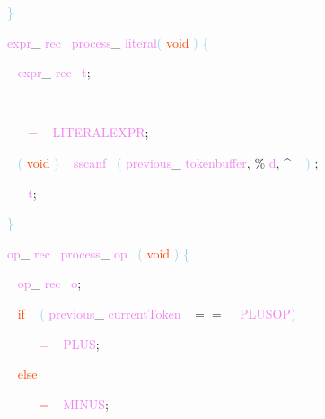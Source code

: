 \documentclass[8, usernames, dvipsnames]{beamer}
\begin{document}
\begin{frame}

 \textcolor{SkyBlue}{\} }

 
 \textcolor{Violet}{expr}\textcolor{Sepia}{\_}
\textcolor{Violet}{rec}\textcolor{White}{\ }
\textcolor{Violet}{process}\textcolor{Sepia}{\_}
\textcolor{Violet}{literal}\textcolor{SkyBlue}{(}
\textcolor{OrangeRed}{void}
\textcolor{SkyBlue}{)}
\textcolor{SkyBlue}{\{ }

 \textcolor{White}{\   }
\textcolor{Violet}{expr}\textcolor{Sepia}{\_}
\textcolor{Violet}{rec}\textcolor{White}{\ }
\textcolor{Violet}{t}\textcolor{Sepia}{;}

 \textcolor{White}{\   }

 \textcolor{White}{\   }
\textcolor{White}{\ }
\textcolor{Salmon}{=}
\textcolor{White}{\ }
\textcolor{Violet}{LITERALEXPR}\textcolor{Sepia}{;}

 \textcolor{White}{\   }
\textcolor{SkyBlue}{(}
\textcolor{OrangeRed}{void}
\textcolor{SkyBlue}{)}
\textcolor{White}{\ }
\textcolor{Violet}{sscanf}\textcolor{White}{\ }
\textcolor{SkyBlue}{(}
\textcolor{Violet}{previous}\textcolor{Sepia}{\_}
\textcolor{Violet}{tokenbuffer}\textcolor{Sepia}{,}
\textcolor{Apricot}{\%}
\textcolor{Violet}{d}\textcolor{Sepia}{,}
\textcolor{MidnightBlue}{\textasciicircum}
\textcolor{White}{\ }
\textcolor{SkyBlue}{)}
\textcolor{Sepia}{;}

 
 \textcolor{White}{\   }
\textcolor{OrangeRed}{	}
\textcolor{White}{\ }
\textcolor{Violet}{t}\textcolor{Sepia}{;}

 \end{frame}
\begin{frame}

 \textcolor{SkyBlue}{\} }

 
 \textcolor{Violet}{op}\textcolor{Sepia}{\_}
\textcolor{Violet}{rec}\textcolor{White}{\ }
\textcolor{Violet}{process}\textcolor{Sepia}{\_}
\textcolor{Violet}{op}\textcolor{White}{\ }
\textcolor{SkyBlue}{(}
\textcolor{OrangeRed}{void}
\textcolor{SkyBlue}{)}
\textcolor{SkyBlue}{\{ }

 
 \textcolor{White}{\   }
\textcolor{Violet}{op}\textcolor{Sepia}{\_}
\textcolor{Violet}{rec}\textcolor{White}{\ }
\textcolor{Violet}{o}\textcolor{Sepia}{;}

 \textcolor{White}{\   }
\textcolor{OrangeRed}{if}
\textcolor{White}{\ }
\textcolor{SkyBlue}{(}
\textcolor{Violet}{previous}\textcolor{Sepia}{\_}
\textcolor{Violet}{currentToken}\textcolor{White}{\ }
\textcolor{OliveGreen}{$==$}
\textcolor{White}{\ }
\textcolor{Violet}{PLUSOP}\textcolor{SkyBlue}{)}

 \textcolor{White}{\   }
\textcolor{White}{\   }
\textcolor{White}{\ }
\textcolor{Salmon}{=}
\textcolor{White}{\ }
\textcolor{Violet}{PLUS}\textcolor{Sepia}{;}

 \textcolor{White}{\   }
\textcolor{OrangeRed}{else}

 \textcolor{White}{\   }
\textcolor{White}{\   }
\textcolor{White}{\ }
\textcolor{Salmon}{=}
\textcolor{White}{\ }
\textcolor{Violet}{MINUS}\textcolor{Sepia}{;}

 \end{frame}
\end{document}

